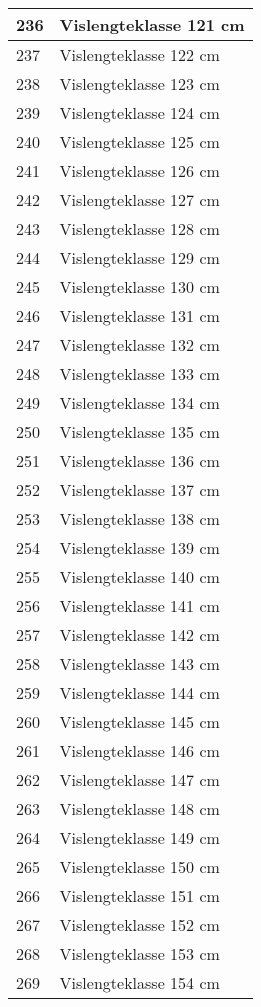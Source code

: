 \documentclass[
]{book}
\begin{document}
\begin{table}
\begin{tabular}[t]{l|l}
\hline
236 & Vislengteklasse 121 cm\\
\hline
237 & Vislengteklasse 122 cm\\
\hline
238 & Vislengteklasse 123 cm\\
\hline
239 & Vislengteklasse 124 cm\\
\hline
240 & Vislengteklasse 125 cm\\
\hline
241 & Vislengteklasse 126 cm\\
\hline
242 & Vislengteklasse 127 cm\\
\hline
243 & Vislengteklasse 128 cm\\
\hline
244 & Vislengteklasse 129 cm\\
\hline
245 & Vislengteklasse 130 cm\\
\hline
246 & Vislengteklasse 131 cm\\
\hline
247 & Vislengteklasse 132 cm\\
\hline
248 & Vislengteklasse 133 cm\\
\hline
249 & Vislengteklasse 134 cm\\
\hline
250 & Vislengteklasse 135 cm\\
\hline
251 & Vislengteklasse 136 cm\\
\hline
252 & Vislengteklasse 137 cm\\
\hline
253 & Vislengteklasse 138 cm\\
\hline
254 & Vislengteklasse 139 cm\\
\hline
255 & Vislengteklasse 140 cm\\
\hline
256 & Vislengteklasse 141 cm\\
\hline
257 & Vislengteklasse 142 cm\\
\hline
258 & Vislengteklasse 143 cm\\
\hline
259 & Vislengteklasse 144 cm\\
\hline
260 & Vislengteklasse 145 cm\\
\hline
261 & Vislengteklasse 146 cm\\
\hline
262 & Vislengteklasse 147 cm\\
\hline
263 & Vislengteklasse 148 cm\\
\hline
264 & Vislengteklasse 149 cm\\
\hline
265 & Vislengteklasse 150 cm\\
\hline
266 & Vislengteklasse 151 cm\\
\hline
267 & Vislengteklasse 152 cm\\
\hline
268 & Vislengteklasse 153 cm\\
\hline
269 & Vislengteklasse 154 cm\\

\end{tabular}
\end{table}
\end{document}
